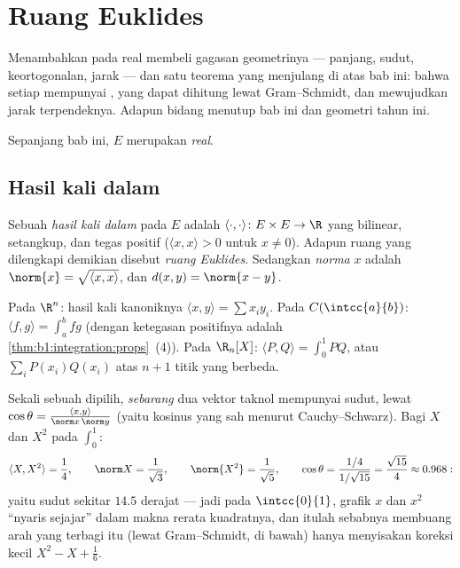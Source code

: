 \chapter{Ruang Euklides}\label{ch:b1:euclid}

Menambahkan  pada  real membeli gagasan
geometrinya --- panjang, sudut, keortogonalan, jarak --- dan satu
teorema yang menjulang di atas bab ini: bahwa setiap  mempunyai
, yang dapat dihitung lewat Gram--Schmidt, dan mewujudkan
jarak terpendeknya. Adapun  bidang menutup bab ini dan
geometri tahun ini.

Sepanjang bab ini, $E$ merupakan  \emph{real}.

\section{Hasil kali dalam}

\begin{definition}\label{def:b1:euclid:def}
Sebuah \emph{hasil kali dalam} pada $E$ adalah 
$\langle\cdot,\cdot\rangle \colon E \times E \to \R$ yang
bilinear, setangkup, dan tegas positif ($\langle x, x\rangle >
0$ untuk $x \neq 0$). Adapun ruang  yang dilengkapi demikian disebut
\emph{ruang Euklides}. Sedangkan \emph{norma}
$x$ adalah $\norm{x} = \sqrt{\langle x, x\rangle}$, dan $d(x, y) =
\norm{x - y}$.
\end{definition}

\begin{example}\label{ex:b1:euclid:examples}
Pada $\R^n$: hasil kali kanoniknya $\langle x, y\rangle = \sum x_i
y_i$. Pada $C(\intcc{a}{b})$: $\langle f, g \rangle = \int_a^b fg$
(dengan ketegasan positifnya adalah \cref{thm:b1:integration:props}~(4)). Pada
$\R_n[X]$: $\langle P, Q\rangle = \int_0^1 PQ$, atau $\sum_{i}
P(x_i)Q(x_i)$ atas $n+1$ titik yang berbeda.
\end{example}

\begin{example}
\label{ex:b1:euclid:polyangle}
Sekali sebuah  dipilih, \emph{sebarang} dua vektor taknol
mempunyai sudut, lewat $\cos\theta = \frac{\langle x,
y\rangle}{\norm x\,\norm y}$ (yaitu kosinus yang sah menurut
Cauchy--Schwarz). Bagi $X$ dan $X^2$ pada $\int_0^1$:
\[
\langle X, X^2\rangle = \frac14, \qquad
\norm X = \frac1{\sqrt3}, \qquad \norm{X^2} = \frac1{\sqrt5},
\qquad
\cos\theta = \frac{1/4}{1/\sqrt{15}} = \frac{\sqrt{15}}{4}
\approx 0.968 :
\]
yaitu sudut sekitar $14.5$ derajat --- jadi pada $\intcc{0}{1}$,
grafik $x$ dan $x^2$ ``nyaris sejajar'' dalam makna
rerata kuadratnya, dan itulah sebabnya membuang arah yang
terbagi itu (lewat Gram--Schmidt, di bawah) hanya menyisakan
koreksi kecil $X^2 - X + \frac16$.
\end{example}

